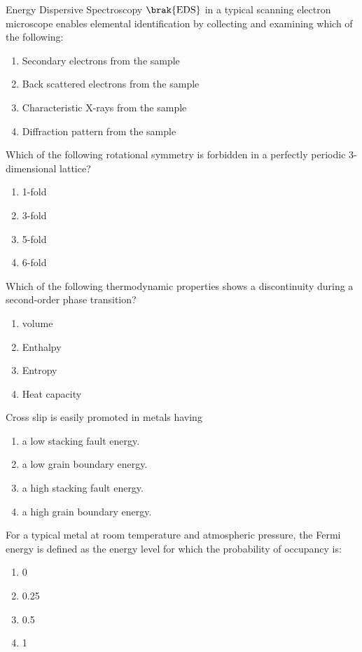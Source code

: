 \bigskip
\item Energy Dispersive Spectroscopy $\brak{\text{EDS}}$ in a typical scanning electron microscope enables elemental identification by collecting and examining which of the following:
\begin{enumerate}
    \item Secondary electrons from the sample
     \item Back scattered electrons from the sample
    \item Characteristic X-rays from the sample
    \item  Diffraction pattern from the sample
\end{enumerate}
\bigskip
\item Which of the following rotational symmetry is forbidden in a perfectly periodic 3-dimensional lattice?
\begin{enumerate}
    \item 1-fold
    \item 3-fold
    \item 5-fold
    \item 6-fold
\end{enumerate}
\bigskip
\item Which of the following thermodynamic properties shows a discontinuity during a second-order phase transition?
\begin{enumerate}
    \item volume
    \item Enthalpy
    \item Entropy
    \item Heat capacity
\end{enumerate}
\bigskip
\item Cross slip is easily promoted in metals having
\begin{enumerate}
    \item a low stacking fault energy.
    \item a low grain boundary energy.
    \item a high stacking fault energy.
    \item a high grain boundary energy.
\end{enumerate}
\bigskip
\item For a typical metal at room temperature and atmospheric pressure, the Fermi energy is defined as the energy level for which the probability of occupancy is:
\begin{enumerate}
    \item 0
    \item 0.25
    \item 0.5
    \item 1
\end{enumerate}
